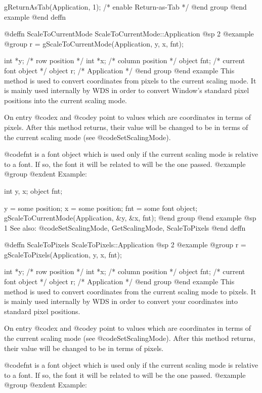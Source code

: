 gReturnAsTab(Application, 1);  /* enable Return-as-Tab */
@end group
@end example
@end deffn



@deffn {ScaleToCurrentMode} ScaleToCurrentMode::Application
@sp 2
@example
@group
r = gScaleToCurrentMode(Application, y, x, fnt);

int     *y;     /*  row position         */
int     *x;     /*  column position      */
object  fnt;    /*  current font object  */
object  r;      /*  Application          */
@end group
@end example
This method is used to convert coordinates from pixels to the current
scaling mode.  It is mainly used internally by WDS in order to
convert Window's standard pixel positions into the current scaling mode.

On entry @code{x} and @code{y} point to values which are coordinates in
terms of pixels.  After this method returns, their value will be changed
to be in terms of the current scaling mode (see @code{SetScalingMode}).

@code{fnt} is a font object which is used only if the current scaling
mode is relative to a font.  If so, the font it will be related to
will be the one passed.
@example
@group
@exdent Example:

int     y, x;
object  fnt;

y = some position;
x = some position;
fnt = some font object;
gScaleToCurrentMode(Application, &y, &x, fnt);
@end group
@end example
@sp 1
See also:  @code{SetScalingMode, GetScalingMode, ScaleToPixels}
@end deffn



@deffn {ScaleToPixels} ScaleToPixels::Application
@sp 2
@example
@group
r = gScaleToPixels(Application, y, x, fnt);

int     *y;     /*  row position         */
int     *x;     /*  column position      */
object  fnt;    /*  current font object  */
object  r;      /*  Application          */
@end group
@end example
This method is used to convert coordinates from the current scaling mode
to pixels.  It is mainly used internally by WDS in order to convert
your coordinates into standard pixel positions.

On entry @code{x} and @code{y} point to values which are coordinates
in terms of the current scaling mode (see @code{SetScalingMode}).
After this method returns, their value will be changed to be in terms
of pixels.

@code{fnt} is a font object which is used only if the current scaling
mode is relative to a font.  If so, the font it will be related to
will be the one passed.
@example
@group
@exdent Example:

